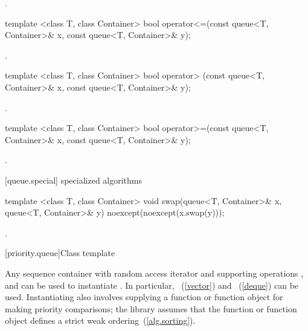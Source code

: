 \begin{itemdescr}
\pnum
\returns
{}.
\end{itemdescr}

%
\begin{itemdecl}
template <class T, class Container>
  bool operator<=(const queue<T, Container>& x, const queue<T, Container>& y);
\end{itemdecl}

\begin{itemdescr}
\pnum
\returns
{}.
\end{itemdescr}

%
\begin{itemdecl}
template <class T, class Container>
  bool operator> (const queue<T, Container>& x, const queue<T, Container>& y);
\end{itemdecl}

\begin{itemdescr}
\pnum
\returns
{}.
\end{itemdescr}

%
\begin{itemdecl}
template <class T, class Container>
    bool operator>=(const queue<T, Container>& x,
                    const queue<T, Container>& y);
\end{itemdecl}

\begin{itemdescr}
\pnum
\returns
{}.
\end{itemdescr}

[queue.special]{ specialized algorithms}

%
%
\begin{itemdecl}
template <class T, class Container>
  void swap(queue<T, Container>& x, queue<T, Container>& y) noexcept(noexcept(x.swap(y)));
\end{itemdecl}

\begin{itemdescr}
\pnum
\effects {}.
\end{itemdescr}

[priority.queue]{Class template }

\pnum
{}%
Any sequence container with random access iterator and supporting operations
,
and
can be used to instantiate
.
In particular,
~(\ref{vector})
and
~(\ref{deque})
can be used.
Instantiating
also involves supplying a function or function object for making
priority comparisons; the library assumes that the function or function
object defines a strict weak ordering~(\ref{alg.sorting}).

